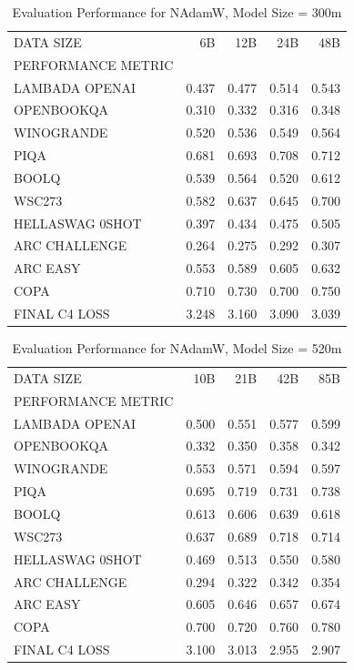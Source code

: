 \begin{table}
[H] \centering \caption{Evaluation Performance for NAdamW, Model Size = 300m}
\label{tab:eval-performance-nadamw-300M}
\begin{tabular}{lrrrr}
\toprule
DATA SIZE & 6B & 12B & 24B & 48B \\
PERFORMANCE METRIC &  &  &  &  \\
\midrule
LAMBADA OPENAI & 0.437 & 0.477 & 0.514 & 0.543 \\
OPENBOOKQA & 0.310 & 0.332 & 0.316 & 0.348 \\
WINOGRANDE & 0.520 & 0.536 & 0.549 & 0.564 \\
PIQA & 0.681 & 0.693 & 0.708 & 0.712 \\
BOOLQ & 0.539 & 0.564 & 0.520 & 0.612 \\
WSC273 & 0.582 & 0.637 & 0.645 & 0.700 \\
HELLASWAG 0SHOT & 0.397 & 0.434 & 0.475 & 0.505 \\
ARC CHALLENGE & 0.264 & 0.275 & 0.292 & 0.307 \\
ARC EASY & 0.553 & 0.589 & 0.605 & 0.632 \\
COPA & 0.710 & 0.730 & 0.700 & 0.750 \\
FINAL C4 LOSS & 3.248 & 3.160 & 3.090 & 3.039 \\
\bottomrule
\end{tabular}
\end{table}


\begin{table}
[H] \centering \caption{Evaluation Performance for NAdamW, Model Size = 520m}
\label{tab:eval-performance-nadamw-520M}
\begin{tabular}{lrrrr}
\toprule
DATA SIZE & 10B & 21B & 42B & 85B \\
PERFORMANCE METRIC &  &  &  &  \\
\midrule
LAMBADA OPENAI & 0.500 & 0.551 & 0.577 & 0.599 \\
OPENBOOKQA & 0.332 & 0.350 & 0.358 & 0.342 \\
WINOGRANDE & 0.553 & 0.571 & 0.594 & 0.597 \\
PIQA & 0.695 & 0.719 & 0.731 & 0.738 \\
BOOLQ & 0.613 & 0.606 & 0.639 & 0.618 \\
WSC273 & 0.637 & 0.689 & 0.718 & 0.714 \\
HELLASWAG 0SHOT & 0.469 & 0.513 & 0.550 & 0.580 \\
ARC CHALLENGE & 0.294 & 0.322 & 0.342 & 0.354 \\
ARC EASY & 0.605 & 0.646 & 0.657 & 0.674 \\
COPA & 0.700 & 0.720 & 0.760 & 0.780 \\
FINAL C4 LOSS & 3.100 & 3.013 & 2.955 & 2.907 \\
\bottomrule
\end{tabular}
\end{table}


